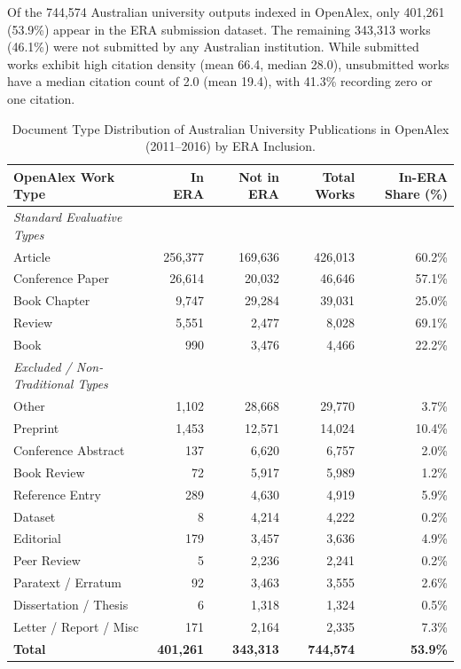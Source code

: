 \documentclass[11pt,a4paper]{article}
\begin{document}
Of the 744,574 Australian university outputs indexed in OpenAlex, only 401,261 (53.9\%) appear in the ERA submission dataset. The remaining 343,313 works (46.1\%) were not submitted by any Australian institution. While submitted works exhibit high citation density (mean 66.4, median 28.0), unsubmitted works have a median citation count of 2.0 (mean 19.4), with 41.3\% recording zero or one citation.

\begin{table}[htbp]
\centering
\footnotesize
\caption{Document Type Distribution of Australian University Publications in OpenAlex (2011--2016) by ERA Inclusion.}
\label{tab:document_types}
\begin{tabularx}{\textwidth}{lrrrr}
\toprule
\textbf{OpenAlex Work Type} & \textbf{In ERA} & \textbf{Not in ERA} & \textbf{Total Works} & \textbf{In-ERA Share (\%)} \\
\midrule
\textit{Standard Evaluative Types} & & & & \\
Article                 & 256,377 & 169,636 & 426,013 & 60.2\% \\
Conference Paper        &  26,614 &  20,032 &  46,646 & 57.1\% \\
Book Chapter            &   9,747 &  29,284 &  39,031 & 25.0\% \\
Review                  &   5,551 &   2,477 &   8,028 & 69.1\% \\
Book                    &     990 &   3,476 &   4,466 & 22.2\% \\
\midrule
\textit{Excluded / Non-Traditional Types} & & & & \\
Other                   &   1,102 &  28,668 &  29,770 &  3.7\% \\
Preprint                &   1,453 &  12,571 &  14,024 & 10.4\% \\
Conference Abstract     &     137 &   6,620 &   6,757 &  2.0\% \\
Book Review             &      72 &   5,917 &   5,989 &  1.2\% \\
Reference Entry         &     289 &   4,630 &   4,919 &  5.9\% \\
Dataset                 &       8 &   4,214 &   4,222 &  0.2\% \\
Editorial               &     179 &   3,457 &   3,636 &  4.9\% \\
Peer Review             &       5 &   2,236 &   2,241 &  0.2\% \\
Paratext / Erratum      &      92 &   3,463 &   3,555 &  2.6\% \\
Dissertation / Thesis   &       6 &   1,318 &   1,324 &  0.5\% \\
Letter / Report / Misc  &     171 &   2,164 &   2,335 &  7.3\% \\
\midrule
\textbf{Total}          & \textbf{401,261} & \textbf{343,313} & \textbf{744,574} & \textbf{53.9\%} \\
\bottomrule
\end{tabularx}
\end{table}
\end{document}

